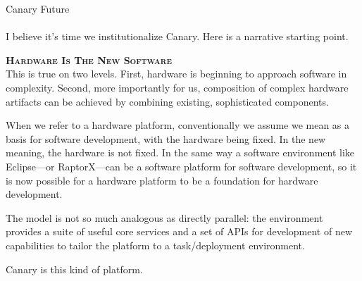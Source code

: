 \documentclass[11pt]{letter} %
\begin{document}


\Huge{Canary Future}\\
\normalsize
\\
I believe it's time we institutionalize Canary. Here is a narrative starting point.

\vspace{20 pt}

\textsc{\textbf {Hardware Is The New Software}}\\
This is true on two levels. First, hardware is beginning to approach software in complexity. Second, more importantly for us, composition of complex hardware artifacts can be achieved by combining existing, sophisticated components. 

When we refer to a hardware platform, conventionally we assume we mean as a basis for software development, with the hardware being fixed. In the new meaning, the hardware is not fixed. In the same way a software environment like Eclipse---or RaptorX---can be a software platform for software development, so it is now possible for a hardware platform to be a foundation for hardware development. 

The model is not so much analogous as directly parallel: the environment provides a suite of useful core services and a set of APIs for development of new capabilities to tailor the platform to a task/deployment environment.

Canary is this kind of platform. 

\vspace{20 pt}
\end{document}
